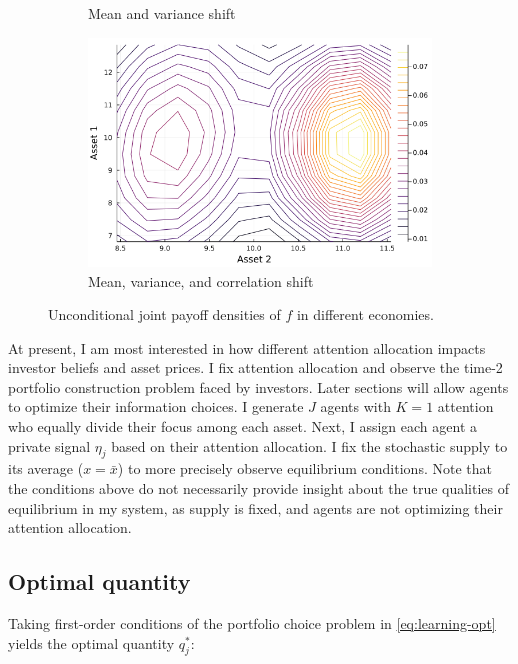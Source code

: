\documentclass{article}
\begin{document}
\begin{figure}
\begin{subfigure}{0.45\textwidth}
        \caption{Mean and variance shift}
    \end{subfigure}
    \begin{subfigure}{0.45\textwidth}
        \includegraphics[width=\textwidth]{../plots/params/more-corr-meanvarshift/prior.png}
        \caption{Mean, variance, and correlation shift}
    \end{subfigure}
    \caption{Unconditional joint payoff densities of $f$ in different economies.}
    \label{fig:priors}
\end{figure}

At present, I am most interested in how different attention allocation impacts investor beliefs and asset prices. I fix attention allocation and observe the time-2 portfolio construction problem faced by investors. Later sections will allow agents to optimize their information choices. I generate $J$ agents with $K=1$ attention who equally divide their focus among each asset. Next, I assign each agent a private signal $\eta_j$ based on their attention allocation. I fix the stochastic supply to its average ($x = \bar x$) to more precisely observe equilibrium conditions. Note that the conditions above do not necessarily provide insight about the true qualities of equilibrium in my system, as supply is fixed, and agents are not optimizing their attention allocation.

\subsection{Optimal quantity}

Taking first-order conditions of the portfolio choice problem in \ref{eq:learning-opt} yields the optimal quantity $q^*_j$:
\end{document}
